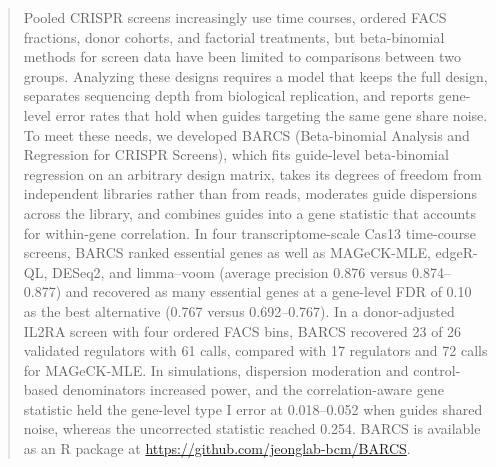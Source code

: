 \begin{abstract}
Pooled CRISPR screens increasingly use time courses, ordered FACS fractions,
donor cohorts, and factorial treatments, but beta-binomial methods for screen
data have been limited to comparisons between two groups.  Analyzing these
designs requires a model that keeps the full design, separates sequencing depth
from biological replication, and reports gene-level error rates that hold when
guides targeting the same gene share noise.  To meet these needs, we developed
BARCS (Beta-binomial Analysis and Regression for CRISPR Screens), which fits
guide-level beta-binomial regression on an arbitrary design matrix, takes its
degrees of freedom from independent libraries rather than from reads,
moderates guide dispersions across the library, and combines guides into a
gene statistic that accounts for within-gene correlation.  In four
transcriptome-scale Cas13 time-course screens, BARCS ranked essential genes as
well as MAGeCK-MLE, edgeR-QL, DESeq2, and limma--voom (average precision 0.876
versus 0.874--0.877) and recovered as many essential genes at a gene-level FDR
of 0.10 as the best alternative (0.767 versus 0.692--0.767).  In a
donor-adjusted IL2RA screen with four ordered FACS bins, BARCS recovered 23 of
26 validated regulators with 61 calls, compared with 17 regulators and 72 calls
for MAGeCK-MLE.  In simulations, dispersion moderation and control-based
denominators increased power, and the correlation-aware gene statistic held
the gene-level type I error at 0.018--0.052 when guides shared noise, whereas
the uncorrected statistic reached 0.254.  BARCS is available as an R package
at \url{https://github.com/jeonglab-bcm/BARCS}.
\end{abstract}

